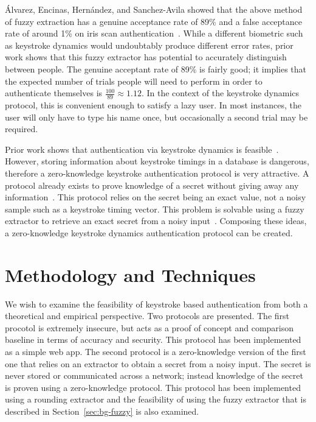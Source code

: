 \documentclass[11pt]{article}
\begin{document}
\'Alvarez, Encinas, Hern\'andez, and Sanchez-Avila showed that the above method of fuzzy extraction has a genuine acceptance rate of 89\% and a false acceptance rate of around 1\% on iris scan authentication~\cite{conf/csreaSAM/AlvarezEA09}. While a different biometric such as keystroke dynamics would undoubtably produce different error rates, prior work shows that this fuzzy extractor has potential to accurately distinguish between people. The genuine acceptant rate of 89\% is fairly good; it implies that the expected number of trials people will need to perform in order to authenticate themselves is $\frac{100}{89}\approx 1.12$. In the context of the keystroke dynamics protocol, this is convenient enough to satisfy a lazy user. In most instances, the user will only have to type his name once, but occasionally a second trial may be required.

Prior work shows that authentication via keystroke dynamics is feasible~\cite{monrose:authentication}. However, storing information about keystroke timings in a database is dangerous, therefore a zero-knowledge keystroke authentication protocol is very attractive. A protocol already exists to prove knowledge of a secret without giving away any information~\cite{crypto-1986-1125}. This protocol relies on the secret being an exact value, not a noisy sample such as a keystroke timing vector. This problem is solvable using a fuzzy extractor to retrieve an exact secret from a noisy input~\cite{conf/csreaSAM/AlvarezEA09}. Composing these ideas, a zero-knowledge keystroke dynamics authentication protocol can be created.

\section{Methodology and Techniques}
\label{sec:methods}

We wish to examine the feasibility of keystroke based authentication from both a theoretical and empirical perspective. Two protocols are presented. The first procotol is extremely insecure, but acts as a proof of concept and comparison baseline in terms of accuracy and security. This protocol has been implemented as a simple web app. The second protocol is a zero-knowledge version of the first one that relies on an extractor to obtain a secret from a noisy input. The secret is never stored or communicated across a network; instead knowledge of the secret is proven using a zero-knowledge protocol. This protocol has been implemented using a rounding extractor and the feasibility of using the fuzzy extractor that is described in Section~\ref{sec:bg-fuzzy} is also examined.
\end{document}
